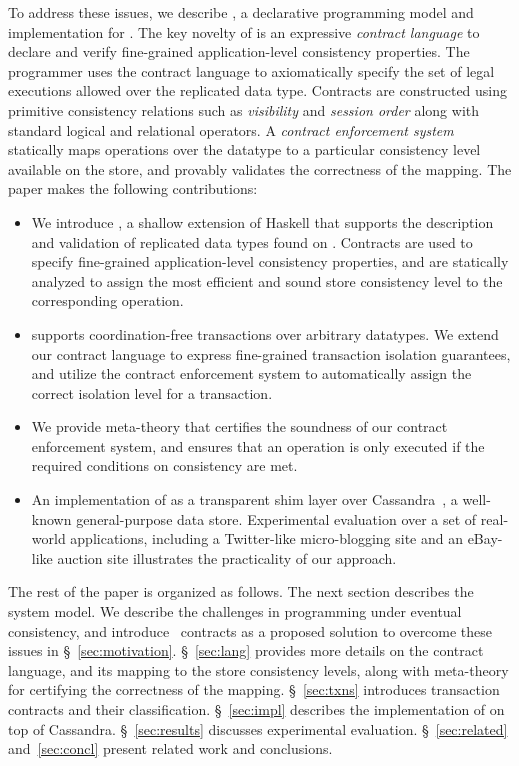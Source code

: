 To address these issues, we describe \name, a declarative programming model and
implementation for \ecds. The key
novelty of \name is an expressive \emph{contract language} to declare and
verify fine-grained application-level consistency properties. The programmer
uses the contract language to axiomatically specify the set of legal executions
allowed over the replicated data type. Contracts are constructed using
primitive consistency relations such as \emph{visibility} and \emph{session
order} along with standard logical and relational operators. A \emph{contract
enforcement system} statically maps operations over the datatype to a
particular consistency level available on the store, and provably validates the
correctness of the mapping. The paper makes the following contributions:

\begin{itemize}[noitemsep]
\item We introduce \name, a shallow extension of Haskell that supports the
	description and validation of replicated data types found on \ecds. Contracts
	are used to specify fine-grained application-level consistency properties,
	and are statically analyzed to assign the most efficient and sound store
	consistency level to the corresponding operation.
\item \name supports coordination-free transactions over arbitrary datatypes.
	We extend our contract language to express fine-grained transaction isolation
	guarantees, and utilize the contract enforcement system to automatically
	assign the correct isolation level for a transaction.
\item We provide meta-theory that certifies the soundness of our contract
	enforcement system, and ensures that an operation is only executed if the
	required conditions on consistency are met.
\item An implementation of \name as a transparent shim layer over
	Cassandra~\cite{Cassandra}, a well-known general-purpose data store.
	Experimental evaluation over a set of real-world applications, including a
	Twitter-like micro-blogging site and an eBay-like auction site illustrates
	the practicality of our approach.
\end{itemize}

\noindent The rest of the paper is organized as follows. The next section
describes the system model.  We describe the challenges in programming under
eventual consistency, and introduce \name\ contracts as a proposed solution to
overcome these issues in \S~\ref{sec:motivation}. \S~\ref{sec:lang} provides
more details on the contract language, and its mapping to the store consistency
levels, along with meta-theory for certifying the correctness of the mapping.
\S~\ref{sec:txns} introduces transaction contracts and their classification.
\S~\ref{sec:impl} describes the implementation of \name on top of Cassandra.
\S~\ref{sec:results} discusses experimental evaluation. \S~\ref{sec:related}
and~\ref{sec:concl} present related work and conclusions.

